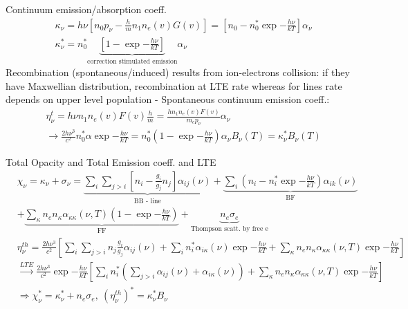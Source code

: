 \begin{frame}{Continuum emission/absorption coeff.}
    \begin{align*}
        &\kappa_{\nu}=h\nu[n_0p_{\nu}-\frac{h}{m}n_1n_e(v)G(v)]=[n_0-n_0^*\exp{-\frac{h\nu}{kT}}]\alpha_{\nu}\\
        &\kappa_{\nu}^*=n_0^*\underbrace{[1-\exp{-\frac{h\nu}{kT}}]}_{\text{correction stimulated emission}}\alpha_{\nu}\tag{LTE}
    \end{align*}
    Recombination (spontaneous/induced) results from ion-electrons collision: if they have Maxwellian distribution, recombination at LTE rate whereas for lines rate depends on upper level population - Spontaneous continuum emission coeff.:
\begin{align*}
    &\eta_{\nu}^t=h\nu n_1n_e(v)F(v)\frac{h}{m}=\frac{hn_1n_e(v)F(v)}{m_ep_{\nu}}\alpha_{\nu}\\
    &\to\frac{2h\nu^3}{c^2}n_0^*\alpha\exp{-\frac{h\nu}{kT}}=n_0^*(1-\exp{-\frac{h\nu}{kT}})\alpha_{\nu}B_{\nu}(T)=\kappa_{\nu}^*B_{\nu}(T)
\end{align*}
\end{frame}

\begin{frame}{Total Opacity and Total Emission coeff. and LTE}
    \begin{align*}
        &\chi_{\nu}=\kappa_{\nu}+\sigma_{\nu}=\underbrace{\sum_i\sum_{j>i}[n_i-\frac{g_i}{g_j}n_j]\alpha_{ij}(\nu)}_{\text{BB - line}}+\underbrace{\sum_i(n_i-n_i^*\exp{-\frac{h\nu}{kT}})\alpha_{ik}(\nu)}_{\text{BF}}\\
        &+\underbrace{\sum_{\kappa}n_en_{\kappa}\alpha_{\kappa\kappa}(\nu,T)(1-\exp{-\frac{h\nu}{kT}})}_{\text{FF}}+\underbrace{n_e\sigma_e}_{\text{Thompson scatt. by free e}}\tag{Tot.Opa.}\\
        &\eta_{\nu}^{th}=\frac{2h\nu^3}{c^2}[\sum_i\sum_{j>i}n_j \frac{g_i}{g_j}\alpha_{ij}(\nu)+\sum_in_i^*\alpha_{i\kappa}(\nu)\exp{-\frac{h\nu}{kT}}+\sum_{\kappa}n_en_{\kappa}\alpha_{\kappa\kappa}(\nu,T)\exp{-\frac{h\nu}{kT}}]\\
        &\xrightarrow{LTE}\frac{2h\nu^3}{c^2}\exp{-\frac{h\nu}{kT}}[\sum_in_i^* (\sum_{j>i}\alpha_{ij}(\nu)+\alpha_{i\kappa}(\nu))+\sum_{\kappa}n_en_{\kappa}\alpha_{\kappa\kappa}(\nu,T)\exp{-\frac{h\nu}{kT}}]\\
        &\Rightarrow\chi_{\nu}^*=\kappa_{\nu}^*+n_e\sigma_e,\ (\eta_{\nu}^{th})^*=\kappa_{\nu}^*B_{\nu}
    \end{align*}
\end{frame}

